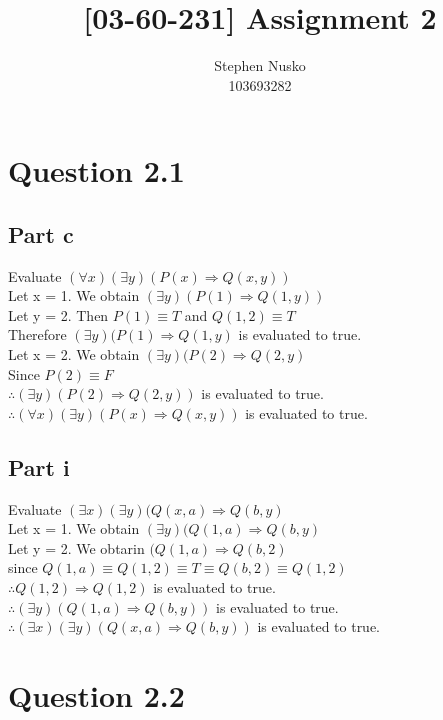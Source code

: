 \documentclass{article}
\title{[03-60-231] Assignment 2}
\author{Stephen Nusko \\ 103693282}
\begin{document}
	\thispagestyle{empty}
	\maketitle	
	\section{Question 2.1}
		\subsection{Part c}
			Evaluate $(\forall x)(\exists y)(P(x) \Rightarrow Q(x, y))$ \\
			Let x = 1. We obtain $(\exists y)(P(1) \Rightarrow Q(1, y))$ \\
			Let y = 2. Then $P(1) \equiv T$ and $Q(1, 2) \equiv T$ \\
			Therefore $(\exists y)(P(1) \Rightarrow Q(1, y)$ is evaluated to true. \\
			Let x = 2. We obtain $(\exists y)(P(2) \Rightarrow Q(2, y)$ \\
			Since $P(2) \equiv F$ \\
			$\therefore (\exists y)(P(2) \Rightarrow Q(2, y))$ is evaluated to true. \\
			$\therefore (\forall x)(\exists y)(P(x) \Rightarrow Q(x, y))$ is evaluated to true. \\
		\subsection{Part i}
			Evaluate $(\exists x)(\exists y)(Q(x, a) \Rightarrow Q(b, y)$ \\
			Let x = 1. We obtain $(\exists y)(Q(1, a) \Rightarrow Q(b, y)$ \\
			Let y = 2. We obtarin $(Q(1, a) \Rightarrow Q(b, 2)$ \\
			since $Q(1, a) \equiv Q(1, 2) \equiv T \equiv Q(b, 2) \equiv Q(1, 2)$ \\
			$\therefore Q(1, 2) \Rightarrow Q(1, 2)$ is evaluated to true. \\
			$\therefore (\exists y)(Q(1, a) \Rightarrow Q(b, y))$ is evaluated to true. \\
			$\therefore (\exists x)(\exists y)(Q(x, a) \Rightarrow Q(b, y))$ is evaluated to true. \\
	\section{Question 2.2}
\end{document}
